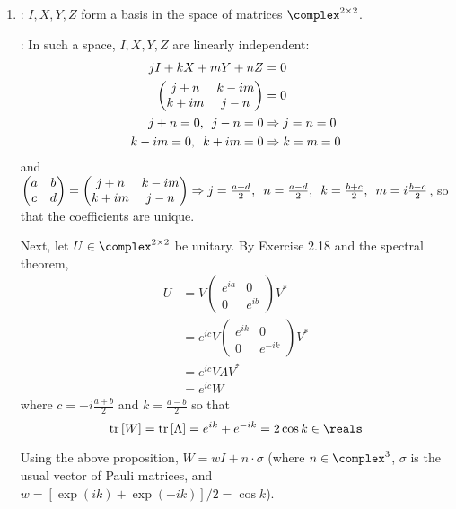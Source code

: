 \begingroup
\newcommand{\tr}[1]{\mathrm{tr} \left[ #1 \right]}
\newcommand{\re}[1]{\mathrm{Re} \left( #1 \right)}
%
\begin{enumerate}
\item {}: $I, X, Y, Z$ form a basis in the space of matrices $\complex^{2 \times 2}$.
%
\par \proof: In such a space, $I, X, Y, Z$ are linearly independent:
%
\begin{align}
j I + k X + m Y + n Z &= 0 \\
\begin{pmatrix} j + n & k - i m \\ k + i m & j - n \end{pmatrix} &= 0 \\
j + n = 0, \enskip j - n = 0 &\Rightarrow j = n = 0 \\
k - i m = 0, \enskip k + i m = 0 &\Rightarrow k = m = 0
\end{align}
%
and $\begin{pmatrix} a & b \\ c & d \end{pmatrix} = \begin{pmatrix} j + n & k - i m \\ k + i m & j - n \end{pmatrix} \Rightarrow j = \frac{a+d}{2}, \enskip n = \frac{a-d}{2}, \enskip k = \frac{b+c}{2}, \enskip m = i \frac{b-c}{2}$, so that the coefficients are unique.
%
\par Next, let $U \in \complex^{2 \times 2}$ be unitary.
%
By Exercise 2.18 and the spectral theorem,
%
\begin{align}
U &= V \begin{pmatrix} e^{ia} & 0 \\ 0 & e^{ib} \end{pmatrix} V^* \\
&= e^{ic} V \begin{pmatrix} e^{ik} & 0 \\ 0 & e^{-i k} \end{pmatrix} V^* \\
&= e^{ic} V \Lambda V^* \\
&= e^{ic} W
\end{align}
%
where $c = -i\frac{a+b}{2}$ and $k = \frac{a-b}{2}$ so that
%
$$
\tr{W} = \tr{\Lambda} = e^{ik} + e^{-ik} = 2 \cos k \in \reals
$$
%
\par Using the above proposition, $W = w I + n \cdot \sigma$ (where $n \in \complex^3$, $\sigma$ is the usual vector of Pauli matrices, and $w = \left[ \exp \left( ik \right) + \exp \left( -ik \right) \right] / 2 = \cos k$).

\end{enumerate}
